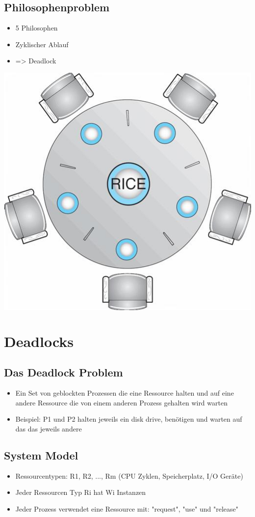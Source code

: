 \documentclass[a4paper]{scrreprt}
\begin{document}
		\subsection{Philosophenproblem}
			\begin{itemize}
				\item 5 Philosophen
				\item Zyklischer Ablauf
				\item => Deadlock
			\end{itemize}
			\includegraphics[scale=0.35]{graphics/philprob.png}
	\section{Deadlocks}
		\subsection{Das Deadlock Problem}
			\begin{itemize}
				\item Ein Set von geblockten Prozessen die eine Ressource halten und auf eine andere Ressource die von einem anderen Prozess gehalten wird warten
				\item Beispiel: P1 und P2 halten jeweils ein disk drive, benötigen und warten auf das das jeweils andere
			\end{itemize}
		\subsection{System Model}
			\begin{itemize}
				\item Ressourcentypen: R1, R2, ..., Rm (CPU Zyklen, Speicherplatz, I/O Geräte)
				\item Jeder Ressourcen Typ Ri hat Wi Instanzen
				\item Jeder Prozess verwendet eine Ressource mit: "request", "use" und "release"
			\end{itemize}
\end{document}
